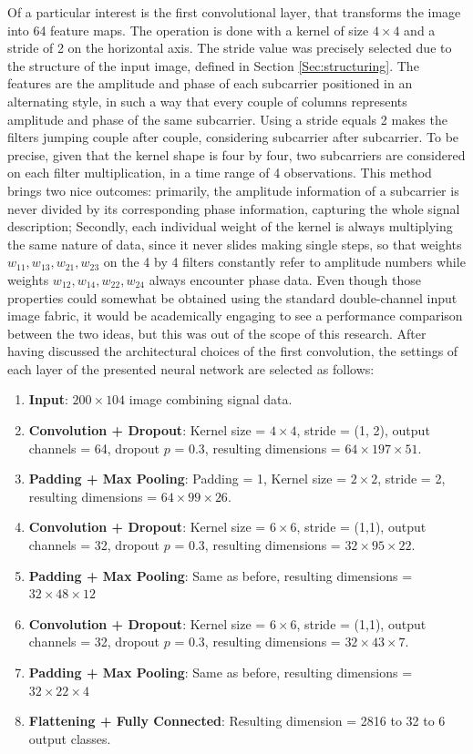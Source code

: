 \documentclass[binding=0.7cm, oneside]{sapthesis}
\begin{document}
Of a particular interest is the first convolutional layer, that transforms the image into 64 feature maps. The operation is done with a kernel of size $4 \times 4$ and a stride of 2 on the horizontal axis. The stride value was precisely selected due to the structure of the input image, defined in Section \ref{Sec:structuring}.
The features are the amplitude and phase of each subcarrier positioned in an alternating style, in such a way that every couple of columns represents amplitude and phase of the same subcarrier. Using a stride equals 2 makes the filters jumping couple after couple, considering subcarrier after subcarrier.
To be precise, given that the kernel shape is four by four, two subcarriers are considered on each filter multiplication, in a time range of 4 observations. This method brings two nice outcomes: primarily, the amplitude information of a subcarrier is never divided by its corresponding phase information, capturing the whole signal
description; Secondly, each individual weight of the kernel is always multiplying the same nature of data, since it never slides making single steps, so that weights $w_{11}, w_{13}, w_{21}, w_{23}$ on the 4 by 4 filters constantly refer to amplitude numbers while weights $w_{12}, w_{14}, w_{22}, w_{24}$ always encounter phase data.
Even though those properties could somewhat be obtained using the standard double-channel input image fabric, it would be academically engaging to see a performance comparison between the two ideas, but this was out of the scope of this research.
After having discussed the architectural choices of the first convolution, the settings of each layer of the presented neural network are selected as follows:

\begin{enumerate}
    \item \textbf{Input}: $200 \times 104$ image combining signal data.
    \item \textbf{Convolution + Dropout}: Kernel size = $4 \times 4$, stride = (1, 2), output channels = 64, dropout $p$ = 0.3, resulting dimensions = $64 \times 197 \times 51$.
    \item \textbf{Padding + Max Pooling}: Padding = 1, Kernel size = $2 \times 2$, stride = 2, resulting dimensions = $64 \times 99 \times 26$.
    \item \textbf{Convolution + Dropout}: Kernel size = $6 \times 6$, stride = (1,1), output channels = 32, dropout $p$ = 0.3, resulting dimensions = $32 \times 95 \times 22$.
    \item \textbf{Padding + Max Pooling}: Same as before, resulting dimensions = $32 \times 48 \times 12$
    \item \textbf{Convolution + Dropout}: Kernel size = $6 \times 6$, stride = (1,1), output channels = 32, dropout $p$ = 0.3, resulting dimensions = $32 \times 43 \times 7$.
    \item \textbf{Padding + Max Pooling}: Same as before, resulting dimensions = $32 \times 22 \times 4$
    \item \textbf{Flattening + Fully Connected}: Resulting dimension = 2816 to 32 to 6 output classes.
\end{enumerate}



\end{document}
